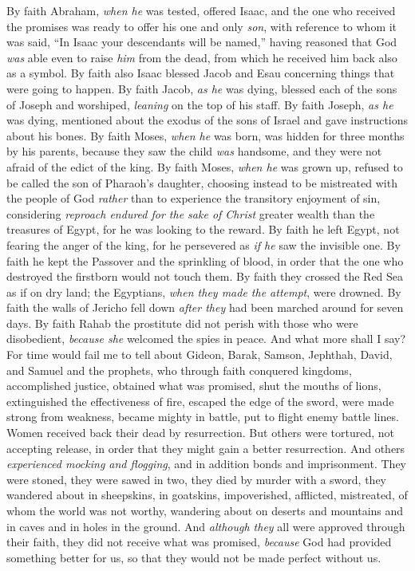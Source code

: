 \begin{biblechapter}
\verse By faith Abraham, \textit{when he} was tested, offered Isaac, and the one who received the promises was ready to offer his one and only \textit{son},
\verse with reference to whom it was said, “In Isaac your descendants will be named,”
\verse having reasoned that God \textit{was} able even to raise \textit{him} from the dead, from which he received him back also as a symbol.
\verse By faith also Isaac blessed Jacob and Esau concerning things that were going to happen.
\verse By faith Jacob, \textit{as he} was dying, blessed each of the sons of Joseph and worshiped, \textit{leaning} on the top of his staff.
\verse By faith Joseph, \textit{as he} was dying, mentioned about the exodus of the sons of Israel and gave instructions about his bones.
\verse By faith Moses, \textit{when he} was born, was hidden for three months by his parents, because they saw the child \textit{was} handsome, and they were not afraid of the edict of the king.
\verse By faith Moses, \textit{when he} was grown up, refused to be called the son of Pharaoh’s daughter,
\verse choosing instead to be mistreated with the people of God \textit{rather} than to experience the transitory enjoyment of sin,
\verse considering \textit{reproach endured for the sake of Christ} greater wealth than the treasures of Egypt, for he was looking to the reward.
\verse By faith he left Egypt, not fearing the anger of the king, for he persevered as \textit{if he} saw the invisible one.
\verse By faith he kept the Passover and the sprinkling of blood, in order that the one who destroyed the firstborn would not touch them.
\verse By faith they crossed the Red Sea as if on dry land; the Egyptians, \textit{when they made the attempt}, were drowned.
\verse By faith the walls of Jericho fell down \textit{after they} had been marched around for seven days.
\verse By faith Rahab the prostitute did not perish with those who were disobedient, \textit{because she} welcomed the spies in peace.
\verse And what more shall I say? For time would fail me to tell about Gideon, Barak, Samson, Jephthah, David, and Samuel and the prophets,
\verse who through faith conquered kingdoms, accomplished justice, obtained what was promised, shut the mouths of lions,
\verse extinguished the effectiveness of fire, escaped the edge of the sword, were made strong from weakness, became mighty in battle, put to flight enemy battle lines.
\verse Women received back their dead by resurrection. But others were tortured, not accepting release, in order that they might gain a better resurrection.
\verse And others \textit{experienced mocking and flogging}, and in addition bonds and imprisonment.
\verse They were stoned, they were sawed in two, they died by murder with a sword, they wandered about in sheepskins, in goatskins, impoverished, afflicted, mistreated,
\verse of whom the world was not worthy, wandering about on deserts and mountains and in caves and in holes in the ground.
\verse And \textit{although they} all were approved through their faith, they did not receive what was promised,
\verse \textit{because} God had provided something better for us, so that they would not be made perfect without us.
\end{biblechapter}

